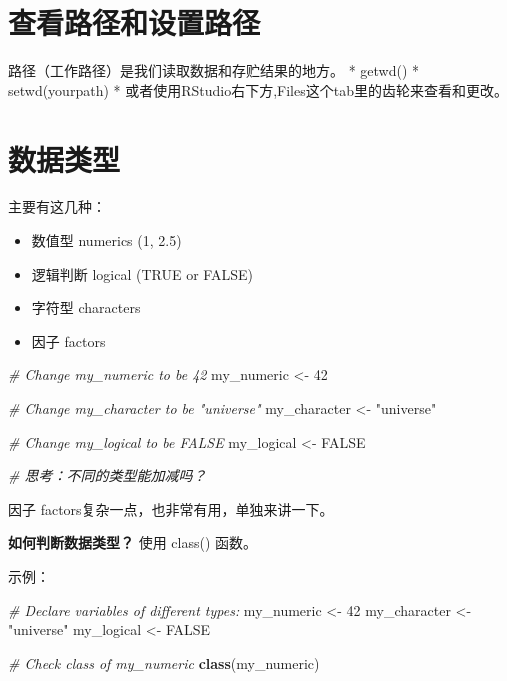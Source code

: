 \documentclass[]{book}
\newenvironment{Shaded}{\begin{snugshade}}{\end{snugshade}}
\newcommand{\CommentTok}[1]{\textcolor[rgb]{0.56,0.35,0.01}{\textit{#1}}}
\newcommand{\DecValTok}[1]{\textcolor[rgb]{0.00,0.00,0.81}{#1}}
\newcommand{\KeywordTok}[1]{\textcolor[rgb]{0.13,0.29,0.53}{\textbf{#1}}}
\newcommand{\NormalTok}[1]{#1}
\newcommand{\OtherTok}[1]{\textcolor[rgb]{0.56,0.35,0.01}{#1}}
\newcommand{\StringTok}[1]{\textcolor[rgb]{0.31,0.60,0.02}{#1}}
\providecommand{\tightlist}{%
  \setlength{\itemsep}{0pt}\setlength{\parskip}{0pt}}
\begin{document}
\section{查看路径和设置路径}

路径（工作路径）是我们读取数据和存贮结果的地方。 * getwd() *
setwd(yourpath) *
或者使用RStudio右下方,Files这个tab里的齿轮来查看和更改。

\section{数据类型}

主要有这几种：

\begin{itemize}
\tightlist
\item
  数值型 numerics (1, 2.5)
\item
  逻辑判断 logical (TRUE or FALSE)
\item
  字符型 characters
\item
  因子 factors
\end{itemize}

\begin{Shaded}
\begin{Highlighting}[]
\CommentTok{# Change my_numeric to be 42}
\NormalTok{my_numeric <-}\StringTok{ }\DecValTok{42}

\CommentTok{# Change my_character to be "universe"}
\NormalTok{my_character <-}\StringTok{ "universe"}

\CommentTok{# Change my_logical to be FALSE}
\NormalTok{my_logical <-}\StringTok{ }\OtherTok{FALSE}

\CommentTok{# 思考：不同的类型能加减吗？}
\end{Highlighting}
\end{Shaded}

因子 factors复杂一点，也非常有用，单独来讲一下。

\textbf{如何判断数据类型？} 使用 class() 函数。

示例：

\begin{Shaded}
\begin{Highlighting}[]
\CommentTok{# Declare variables of different types:}
\NormalTok{my_numeric <-}\StringTok{ }\DecValTok{42}
\NormalTok{my_character <-}\StringTok{ "universe"}
\NormalTok{my_logical <-}\StringTok{ }\OtherTok{FALSE}

\CommentTok{# Check class of my_numeric}
\KeywordTok{class}\NormalTok{(my_numeric)}
\end{Highlighting}
\end{Shaded}
\end{document}
